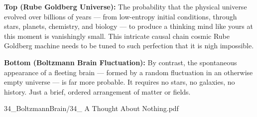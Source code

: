 \begin{SideNotePage}{
  \textbf{Top (Rube Goldberg Universe):}  
  The probability that the physical universe evolved over billions of years — from low-entropy initial conditions, through stars, planets, chemistry, and biology — to produce a thinking mind like yours at this moment is vanishingly small. This intricate causal chain cosmic Rube Goldberg machine needs to be tuned to such perfection that it is nigh impossible. \par

  \textbf{Bottom (Boltzmann Brain Fluctuation):}  
  By contrast, the spontaneous appearance of a fleeting brain — formed by a random fluctuation in an otherwise empty universe — is far more probable. It requires no stars, no galaxies, no history. Just a brief, ordered arrangement of matter or fields.\par
}{34_BoltzmannBrain/34_ A Thought About Nothing.pdf}
\end{SideNotePage}
